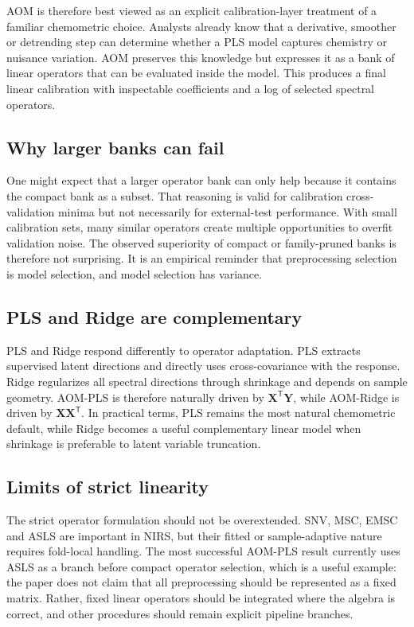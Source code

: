 \documentclass[11pt,a4paper]{article}
\newcommand{\X}{\mathbf{X}}
\newcommand{\Y}{\mathbf{Y}}
\newcommand{\transpose}{^{\mathsf T}}
\begin{document}
AOM is therefore best viewed as an explicit calibration-layer treatment of a
familiar chemometric choice.  Analysts already know that a derivative, smoother
or detrending step can determine whether a PLS model captures chemistry or
nuisance variation.  AOM preserves this knowledge but expresses it as a bank of
linear operators that can be evaluated inside the model.  This produces a final
linear calibration with inspectable coefficients and a log of selected spectral
operators.

\subsection{Why larger banks can fail}

One might expect that a larger operator bank can only help because it contains
the compact bank as a subset.  That reasoning is valid for calibration
cross-validation minima but not necessarily for external-test performance.
With small calibration sets, many similar operators create multiple
opportunities to overfit validation noise.  The observed superiority of compact
or family-pruned banks is therefore not surprising.  It is an empirical
reminder that preprocessing selection is model selection, and model selection
has variance.

\subsection{PLS and Ridge are complementary}

PLS and Ridge respond differently to operator adaptation.  PLS extracts
supervised latent directions and directly uses cross-covariance with the
response.  Ridge regularizes all spectral directions through shrinkage and
depends on sample geometry.  AOM-PLS is therefore naturally driven by
$\X\transpose\Y$, while AOM-Ridge is driven by $\X\X\transpose$.  In practical
terms, PLS remains the most natural chemometric default, while Ridge becomes a
useful complementary linear model when shrinkage is preferable to latent
variable truncation.

\subsection{Limits of strict linearity}

The strict operator formulation should not be overextended.  SNV, MSC, EMSC
and ASLS are important in NIRS, but their fitted or sample-adaptive nature
requires fold-local handling.  The most successful AOM-PLS result currently
uses ASLS as a branch before compact operator selection, which is a useful
example: the paper does not claim that all preprocessing should be represented
as a fixed matrix.  Rather, fixed linear operators should be integrated where
the algebra is correct, and other procedures should remain explicit pipeline
branches.
\end{document}
